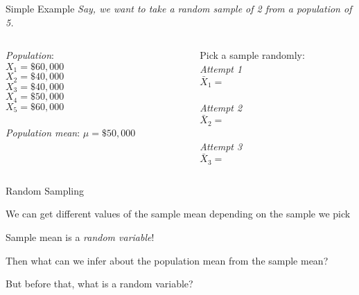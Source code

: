 \documentclass{./../div_teaching_slides}
\begin{document}
\begin{frame}{Simple Example}
\vspace{-0.25em}
\textit{Say, we want to take a random sample of 2 from a population of 5.} \\ \vspace{0.5em}
\begin{columns}[T]
\begin{column}{0.3\textwidth}
\textit{Population}: \\
\( X_1 = \$60,000 \) \\
\(X_2 = \$40,000 \) \\
\( X_3 = \$40,000 \) \\
\(X_4 = \$50,000 \) \\
\(X_5 = \$60,000 \) \\~\\
\textit{Population mean}:
\(\mu = \$50,000\)
\end{column}	
\begin{column}{0.625\textwidth}
Pick a sample randomly: \href{https://tools-unite.com/tools/random-picker-wheel?inputs=1:1,2:1,3:1,4:1,5:1}{} \\ \vspace{0.5em}
\textit{Attempt 1}  \\ \vspace{0.25em}
$ \bar{X}_1 =  $ \\~\\
\textit{Attempt 2}  \\ \vspace{0.25em}
$ \bar{X}_2 =  $ \\~\\
\textit{Attempt 3}  \\ \vspace{0.25em}
$ \bar{X}_3 = $
\end{column}	
\end{columns}
\end{frame}


\begin{frame}{Random Sampling}
\begin{witemize}
\item We can get different values of the sample mean depending on the sample we pick
\item Sample mean is a \textit{random variable}!
\item Then what can we infer about the population mean from the sample mean?
\item But before that, what is a random variable?
\end{witemize}
\end{frame}
\end{document}
